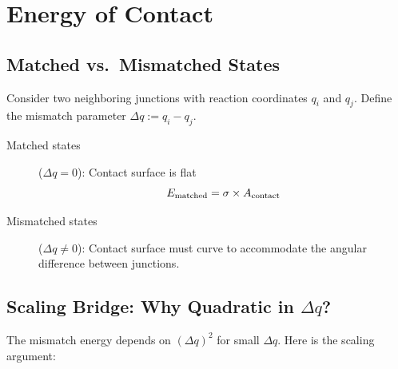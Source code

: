 \section{Energy of Contact}
\label{sec:sigmaK:energy}

\subsection{Matched vs.\ Mismatched States}

Consider two neighboring junctions with reaction coordinates $q_i$ and $q_j$.
Define the mismatch parameter $\Delta q := q_i - q_j$.

\begin{description}
    \item[Matched states] ($\Delta q = 0$): Contact surface is flat
        \begin{equation}
            E_{\text{matched}} = \sigma \times A_{\text{contact}}
            \label{eq:E_matched}
        \end{equation}
    \item[Mismatched states] ($\Delta q \neq 0$): Contact surface must curve
        to accommodate the angular difference between junctions.
\end{description}

\subsection{Scaling Bridge: Why Quadratic in $\Delta q$?}
\label{sec:sigmaK:scaling_bridge}

The mismatch energy depends on $(\Delta q)^2$ for small $\Delta q$. Here is the
scaling argument:

